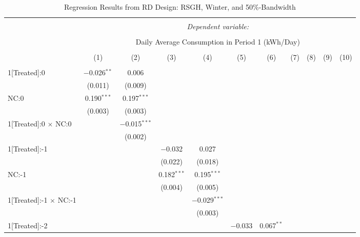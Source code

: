 \begin{table}[!htbp]
\centering 
\caption{Regression Results from RD Design: RSGH, Winter, and 50\%-Bandwidth} 
\label{} 
\footnotesize
\begin{adjustbox}{scale = 0.75}
\begin{tabular}{@{\extracolsep{5pt}}lcccccccccc} 
\\[-1.8ex]\hline 
\hline \\[-1.8ex] 
 & \multicolumn{10}{c}{\textit{Dependent variable:}} \\ 
\cline{2-11} 
\\[-1.8ex] & \multicolumn{10}{c}{Daily Average Consumption in Period 1 (kWh/Day)} \\ 
\\[-1.8ex] & (1) & (2) & (3) & (4) & (5) & (6) & (7) & (8) & (9) & (10)\\ 
\hline \\[-1.8ex] 
 1[Treated]:0 & $-$0.026$^{**}$ & 0.006 &  &  &  &  &  &  &  &  \\ 
  & (0.011) & (0.009) &  &  &  &  &  &  &  &  \\ 
 NC:0 & 0.190$^{***}$ & 0.197$^{***}$ &  &  &  &  &  &  &  &  \\ 
  & (0.003) & (0.003) &  &  &  &  &  &  &  &  \\ 
 1[Treated]:0 $\times$ NC:0 &  & $-$0.015$^{***}$ &  &  &  &  &  &  &  &  \\ 
  &  & (0.002) &  &  &  &  &  &  &  &  \\ 
 1[Treated]:-1 &  &  & $-$0.032 & 0.027 &  &  &  &  &  &  \\ 
  &  &  & (0.022) & (0.018) &  &  &  &  &  &  \\ 
 NC:-1 &  &  & 0.182$^{***}$ & 0.195$^{***}$ &  &  &  &  &  &  \\ 
  &  &  & (0.004) & (0.005) &  &  &  &  &  &  \\ 
 1[Treated]:-1 $\times$ NC:-1 &  &  &  & $-$0.029$^{***}$ &  &  &  &  &  &  \\ 
  &  &  &  & (0.003) &  &  &  &  &  &  \\ 
 1[Treated]:-2 &  &  &  &  & $-$0.033 & 0.067$^{**}$ &  &  &  &  \\ 

\end{tabular}
\end{adjustbox}
\end{table}

